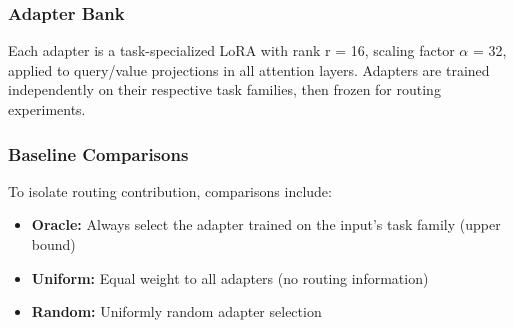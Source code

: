 \subsubsection{Adapter Bank}

Each adapter is a task-specialized LoRA with rank r = 16, scaling factor $\alpha$ = 32, applied to query/value projections in all attention layers. Adapters are trained independently on their respective task families, then frozen for routing experiments.

\subsubsection{Baseline Comparisons}

To isolate routing contribution, comparisons include:
\begin{itemize}
\item \textbf{Oracle:} Always select the adapter trained on the input's task family (upper bound)
\item \textbf{Uniform:} Equal weight to all adapters (no routing information)
\item \textbf{Random:} Uniformly random adapter selection
\end{itemize}
